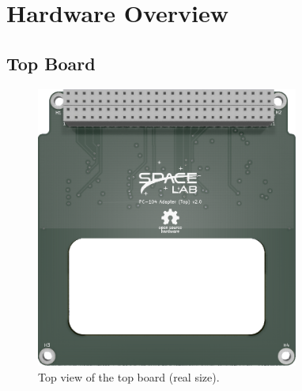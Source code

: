 %
%
%
%
%

%
%
%
%
%
%

\chapter{Hardware Overview} \label{ch:hardware}

\section{Top Board}

\begin{figure}[!htb]
    \begin{center}
        \includegraphics[width=8.636cm]{figures/pc104-adapter-top-top}
        \caption{Top view of the top board (real size).}
        \label{fig:top-board-top}
    \end{center}
\end{figure}

